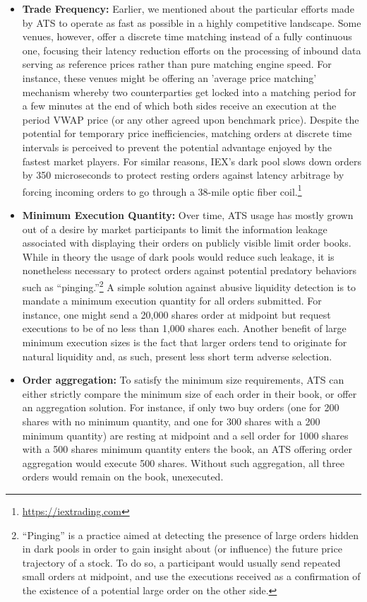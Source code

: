 \begin{itemize}
\item{\textbf{Trade Frequency:}} Earlier, we mentioned about the particular efforts made by ATS to operate as fast as possible in a highly competitive landscape. Some venues, however, offer a discrete time matching instead of a fully continuous one, focusing their latency reduction efforts on the processing of inbound data serving as reference prices rather than pure matching engine speed. For instance, these venues might be offering an 'average price matching' mechanism whereby two counterparties get locked into a matching period for a few minutes at the end of which both sides receive an execution at the period VWAP price (or any other agreed upon benchmark price). Despite the potential for temporary price inefficiencies, matching orders at discrete time intervals is perceived to prevent the potential advantage enjoyed by the fastest market players. For similar reasons, IEX's dark pool slows down orders by 350 microseconds to protect resting orders against latency arbitrage by forcing incoming orders to go through a 38-mile optic fiber coil.\footnote{\url{https://iextrading.com}}

\item{\textbf{Minimum Execution Quantity:}} Over time, ATS usage has mostly grown out of a desire by market participants to limit the information leakage associated with displaying their orders on publicly visible limit order books. While in theory the usage of dark pools would reduce such leakage, it is nonetheless necessary to protect orders against potential predatory behaviors such as ``pinging.''\footnote{``Pinging'' is a practice aimed at detecting the presence of large orders hidden in dark pools in order to gain insight about (or influence) the future price trajectory of a stock. To do so, a participant would usually send repeated small orders at midpoint, and use the executions received as a confirmation of the existence of a potential large order on the other side.} A simple solution against abusive liquidity detection is to mandate a minimum execution quantity for all orders submitted. For instance, one might send a 20,000 shares order at midpoint but request executions to be of no less than 1,000 shares each. Another benefit of large minimum execution sizes is the fact that larger orders tend to originate for natural liquidity and, as such, present less short term adverse selection.  

\item{\textbf{Order aggregation:}} To satisfy the minimum size requirements, ATS can either strictly compare the minimum size of each order in their book, or offer an aggregation solution. For instance, if only two buy orders (one for 200 shares with no minimum quantity, and one for 300 shares with a 200 minimum quantity) are resting at midpoint and a sell order for 1000 shares with a 500 shares minimum quantity enters the book, an ATS offering order aggregation would execute 500 shares. Without such aggregation, all three orders would remain on the book, unexecuted.


\end{itemize}
